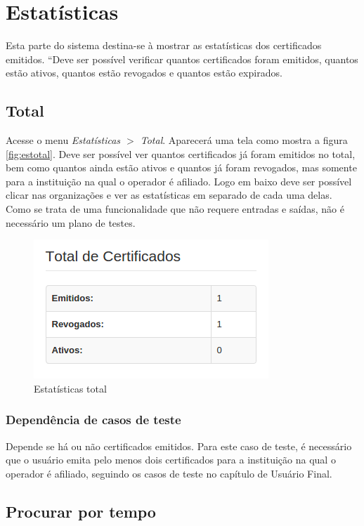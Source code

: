 \section{Estatísticas}

Esta parte do sistema destina-se à mostrar as estatísticas dos certificados emitidos. “Deve ser possível verificar quantos certificados foram emitidos, quantos estão ativos, quantos estão revogados e quantos estão expirados.

\subsection{Total}

Acesse o menu \textit{Estatísticas $>$ Total}. Aparecerá uma tela como mostra a figura \ref{fig:estotal}. Deve ser possível ver quantos certificados já foram emitidos no total, bem como quantos ainda estão ativos e quantos já foram revogados, mas somente para a instituição na qual o operador é afiliado. Logo em baixo deve ser possível clicar nas organizações e ver as estatísticas em separado de cada uma delas. Como se trata de uma funcionalidade que não requere entradas e saídas, não é necessário um plano de testes.

\begin{figure}[ht]
     \centering
     \includegraphics[scale=0.6]{images/estatisticaop.png}
     \caption{Estatísticas total}
     \label{fig:estotalop}
\end{figure}

\subsubsection{Dependência de casos de teste}
Depende se há ou não certificados emitidos. Para este caso de teste, é necessário que o usuário emita pelo menos dois certificados para a instituição na qual o operador é afiliado, seguindo os casos de teste no capítulo de Usuário Final.

\subsection{Procurar por tempo}

